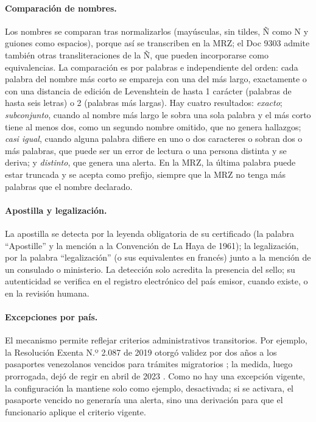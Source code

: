 \documentclass[11pt,a4paper]{article}
\begin{document}
\paragraph{Comparación de nombres.} Los nombres se comparan tras normalizarlos (mayúsculas, sin tildes, Ñ como N y guiones como espacios), porque así se transcriben en la MRZ; el Doc 9303 admite también otras transliteraciones de la Ñ, que pueden incorporarse como equivalencias. La comparación es por palabras e independiente del orden: cada palabra del nombre más corto se empareja con una del más largo, exactamente o con una distancia de edición de Levenshtein \cite{levenshtein1966} de hasta 1 carácter (palabras de hasta seis letras) o 2 (palabras más largas). Hay cuatro resultados: \emph{exacto}; \emph{subconjunto}, cuando al nombre más largo le sobra una sola palabra y el más corto tiene al menos dos, como un segundo nombre omitido, que no genera hallazgos; \emph{casi igual}, cuando alguna palabra difiere en uno o dos caracteres o sobran dos o más palabras, que puede ser un error de lectura o una persona distinta y se deriva; y \emph{distinto}, que genera una alerta. En la MRZ, la última palabra puede estar truncada y se acepta como prefijo, siempre que la MRZ no tenga más palabras que el nombre declarado.

\paragraph{Apostilla y legalización.} La apostilla se detecta por la leyenda obligatoria de su certificado (la palabra ``Apostille'' y la mención a la Convención de La Haya de 1961); la legalización, por la palabra ``legalización'' (o sus equivalentes en francés) junto a la mención de un consulado o ministerio. La detección solo acredita la presencia del sello; su autenticidad se verifica en el registro electrónico del país emisor, cuando existe, o en la revisión humana.

\paragraph{Excepciones por país.} El mecanismo permite reflejar criterios administrativos transitorios. Por ejemplo, la Resolución Exenta N.º 2.087 de 2019 otorgó validez por dos años a los pasaportes venezolanos vencidos para trámites migratorios \cite{resex2087}; la medida, luego prorrogada, dejó de regir en abril de 2023 \cite{meganoticias2023}. Como no hay una excepción vigente, la configuración la mantiene solo como ejemplo, desactivada; si se activara, el pasaporte vencido no generaría una alerta, sino una derivación para que el funcionario aplique el criterio vigente.
\end{document}
